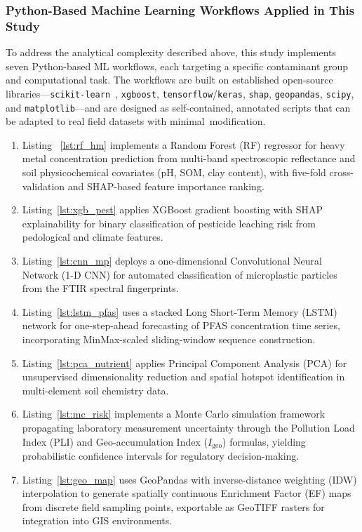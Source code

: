 \documentclass[environremediat,article,accept,pdftex,oneauthor]{Definitions/mdpi}
\begin{document}
\subsubsection{Python-Based Machine Learning Workflows Applied in
    This Study}\label{sec2.0.3}

{To address the analytical complexity described above,
this study implements seven Python-based ML workflows, each targeting
a specific contaminant group and computational task. The workflows are
built on established open-source libraries}---\texttt{scikit-learn%
},
\texttt{xgboost}, \texttt{tensorflow}/\texttt{keras}, \texttt{shap},
\texttt{geopandas}, \texttt{scipy}, and \texttt{matplotlib}---and are
designed as self-contained, annotated scripts that can be adapted to
real field datasets with \mbox{minimal modification.}

\begin{enumerate}[leftmargin=7.5mm,labelsep=0.5mm,topsep=3pt]
\item Listing%
~\ref{lst:rf_hm} implements a Random Forest (RF) regressor for heavy metal
concentration prediction from multi-band spectroscopic reflectance and
soil physicochemical covariates (pH, SOM, clay content), with
five-fold cross-validation and SHAP-based feature importance ranking.
\item Listing~\ref{lst:xgb_pest} applies XGBoost gradient boosting with SHAP explainability
for binary classification of pesticide leaching risk from pedological
and climate features. 
\item Listing~\ref{lst:cnn_mp} deploys a one-dimensional Convolutional
Neural Network (1-D CNN) for automated classification of microplastic
particles from the FTIR spectral fingerprints. 
\item Listing~\ref{lst:lstm_pfas} uses a
stacked Long Short-Term Memory (LSTM) network for one-step-ahead
forecasting of PFAS concentration time series, incorporating
MinMax-scaled sliding-window sequence construction. 
\item Listing~\ref{lst:pca_nutrient} applies
Principal Component Analysis (PCA) for unsupervised dimensionality
reduction and spatial hotspot identification in multi-element soil
chemistry data. 
\item Listing~\ref{lst:mc_risk} implements a Monte Carlo simulation framework
propagating laboratory measurement uncertainty through the Pollution
Load Index (PLI) and Geo-accumulation Index ($I_\mathrm{geo}$)
formulas, yielding probabilistic confidence intervals for regulatory
decision-making. 
\item Listing~\ref{lst:geo_map} uses GeoPandas with inverse-distance
weighting (IDW) interpolation to generate spatially continuous
Enrichment Factor (EF) maps from discrete field sampling points,
exportable as GeoTIFF rasters for integration into GIS environments.
\end{enumerate}
\end{document}
